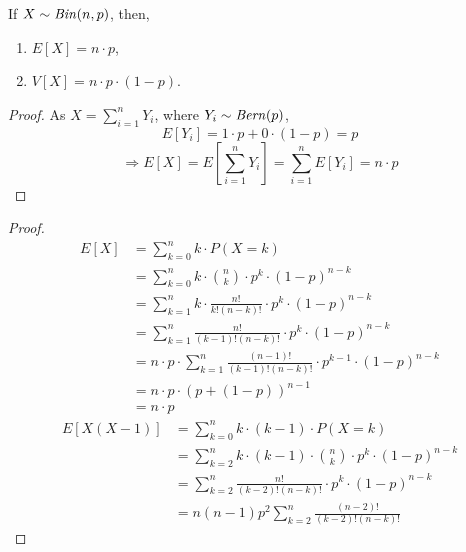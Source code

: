 \begin{theorem}
    If $X \sim \text{\emph{Bin}}(n, p)$, then,
    \begin{enumerate}[noitemsep, topsep=0em]
        \item $E[X] = n \cdot p$,
        \item $V[X] = n \cdot p \cdot (1 - p)$.
    \end{enumerate}
\end{theorem}
\begin{proof}
    As $X = \sum_{i = 1}^n Y_i$, where $Y_i \sim \text{\emph{Bern}}(p)$,
    \[ E[Y_i] = 1 \cdot p + 0 \cdot (1 - p) = p \]
    \[ \Rightarrow 
       E[X] = E[\sum_{i = 1}^n Y_i] = \sum_{i = 1}^n E[Y_i] = n \cdot p \]
\end{proof}
\begin{proof}
    \begin{align*}
        E[X] &= \sum_{k = 0}^n k \cdot P(X = k)                              \\
             &= \sum_{k = 0}^n k \cdot {n \choose k} \cdot p^k \cdot 
                (1-p)^{n-k}                                                  \\
             &= \sum_{k = 1}^n k \cdot \frac{n!}{k!(n-k)!} \cdot p^k \cdot
                (1-p)^{n-k}                                                  \\
             &= \sum_{k = 1}^n \frac{n!}{(k-1)! (n-k)!} \cdot p^k \cdot 
                (1-p)^{n-k}                                                  \\
             &= n \cdot p \cdot \sum_{k = 1}^n \frac{(n - 1)!}{(k-1)!(n-k)!}
                \cdot p^{k - 1} \cdot (1-p)^{n-k}                            \\
             &= n \cdot p \cdot (p + (1 - p))^{n-1}                          \\
             &= n \cdot p
    \end{align*}
    \begin{align*}
        E[X(X - 1)] &= \sum_{k = 0}^n k \cdot (k - 1) \cdot P(X = k)        \\
                    &= \sum_{k = 2}^n k \cdot (k - 1) \cdot
                       {n \choose k} \cdot p^k \cdot (1-p)^{n-k}            \\
                    &= \sum_{k = 2}^n \frac{n!}{(k - 2)!(n - k)!} \cdot
                       p^k \cdot (1 - p)^{n - k}                            \\
                    &= n(n-1)p^2 \sum_{k = 2}^n \frac{(n-2)!}{(k-2)!(n-k)!}

\end{align*}
\end{proof}
